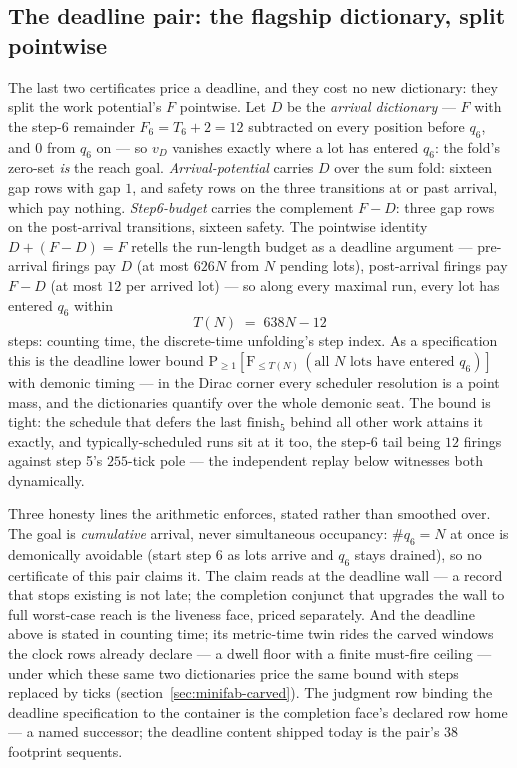 

\subsection{The deadline pair: the flagship dictionary, split
pointwise}
\label{sec:minifab-deadline}

The last two certificates price a deadline, and they cost no new
dictionary: they split the work potential's $F$ pointwise. Let $D$
be the \emph{arrival dictionary} --- $F$ with the step-6 remainder
$F_6 = T_6 + 2 = 12$ subtracted on every position before $q_6$, and
$0$ from $q_6$ on --- so $v_D$ vanishes exactly where a lot has
entered $q_6$: the fold's zero-set \emph{is} the reach goal.
\emph{Arrival-potential} carries $D$ over the sum fold: sixteen gap
rows with gap $1$, and safety rows on the three transitions at or
past arrival, which pay nothing. \emph{Step6-budget} carries the
complement $F - D$: three gap rows on the post-arrival transitions,
sixteen safety. The pointwise identity $D + (F - D) = F$ retells the
run-length budget as a deadline argument --- pre-arrival firings pay
$D$ (at most $626N$ from $N$ pending lots), post-arrival firings pay
$F - D$ (at most $12$ per arrived lot) --- so along every maximal
run, every lot has entered $q_6$ within
\[
  T(N) \;=\; 638N - 12
\]
steps: counting time, the discrete-time unfolding's step index. As a
specification this is the deadline lower bound
$\mathrm{P}_{\ge 1}\!\left[\mathrm{F}_{\le T(N)}\,
(\text{all $N$ lots have entered } q_6)\right]$ with demonic timing
--- in the Dirac corner every scheduler resolution is a point mass,
and the dictionaries quantify over the whole demonic seat. The
bound is tight: the schedule that defers the last
$\mathrm{finish}_5$ behind all other work attains it exactly, and
typically-scheduled runs sit at it too, the step-6 tail being $12$
firings against step 5's $255$-tick pole --- the independent replay
below witnesses both dynamically.

Three honesty lines the arithmetic enforces, stated rather than
smoothed over. The goal is \emph{cumulative} arrival, never
simultaneous occupancy: $\#q_6 = N$ at once is demonically avoidable
(start step 6 as lots arrive and $q_6$ stays drained), so no
certificate of this pair claims it. The claim reads at the deadline
wall --- a record that stops existing is not late; the completion
conjunct that upgrades the wall to full worst-case reach is the
liveness face, priced separately. And the deadline above is
stated in counting time; its metric-time twin rides the carved
windows the clock rows already declare --- a dwell floor with a
finite must-fire ceiling --- under which these same two
dictionaries price the same bound with steps replaced by ticks
(section~\ref{sec:minifab-carved}). The
judgment row binding the deadline specification to the container is
the completion face's declared row home --- a named successor; the
deadline content shipped today is the pair's $38$ footprint
sequents.

